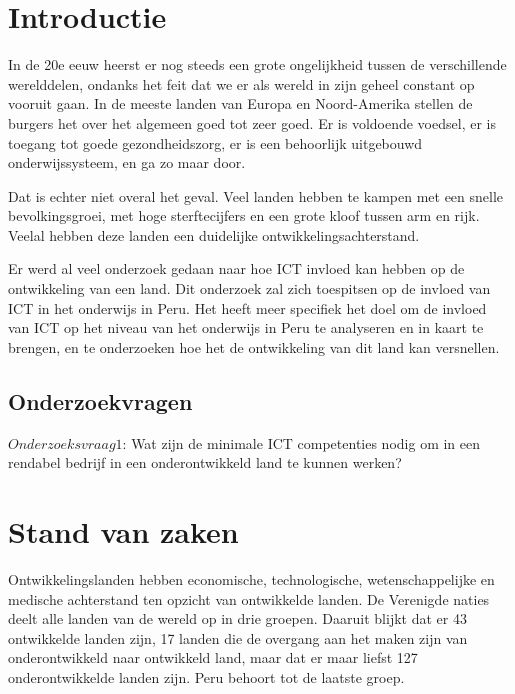 
\section{Introductie} %
\label{sec:introductie}

In de 20e eeuw heerst er nog steeds een grote ongelijkheid tussen de verschillende werelddelen, ondanks het feit dat we er als wereld in zijn geheel constant op vooruit gaan. In de meeste landen van Europa en Noord-Amerika stellen de burgers het over het algemeen goed tot zeer goed. Er is voldoende voedsel, er is toegang tot goede gezondheidszorg, er is een behoorlijk uitgebouwd onderwijssysteem, en ga zo maar door. 

Dat is echter niet overal het geval. Veel landen hebben te kampen met een snelle bevolkingsgroei, met hoge sterftecijfers en een grote kloof tussen arm en rijk. Veelal hebben deze landen een duidelijke ontwikkelingsachterstand.

Er werd al veel onderzoek gedaan naar hoe ICT invloed kan hebben op de ontwikkeling van een land. Dit onderzoek zal zich toespitsen op de invloed van ICT in het onderwijs in Peru. Het heeft meer specifiek het doel om de invloed van ICT op het niveau van het onderwijs in Peru te analyseren en in kaart te brengen, en te onderzoeken hoe het de ontwikkeling van dit land kan versnellen.

\subsection{Onderzoekvragen}
$Onderzoeksvraag 1$: Wat zijn de minimale ICT competenties nodig om in een rendabel bedrijf in een onderontwikkeld land te kunnen werken?




\section{Stand van zaken}
\label{sec:state-of-the-art}
Ontwikkelingslanden hebben economische, technologische, wetenschappelijke en medische achterstand ten opzicht van ontwikkelde landen. De Verenigde naties deelt alle landen van de wereld op in drie groepen. Daaruit blijkt dat er 43 ontwikkelde landen zijn, 17 landen die de overgang aan het maken zijn van onderontwikkeld naar ontwikkeld land, maar dat er maar liefst 127 onderontwikkelde landen zijn. Peru behoort tot de laatste groep. \autocite{unitednations2019} 

